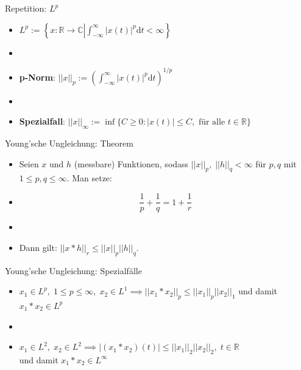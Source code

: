 \documentclass[14pt, aspectratio=169, handout]{beamer}
\begin{document}
\begin{frame}{Repetition: $L^p$}
    \begin{itemize}
        \item $L^p := \left\{ x:\mathbb{R} \to \mathbb{C} \left| \displaystyle\int_{-\infty}^{\infty} |x(t)|^p \text{d}t < \infty \right. \right\}$
        \item[] 
        \item \textbf{p-Norm}: $||x||_p := \left(\displaystyle\int_{-\infty}^{\infty} |x(t)|^p \text{d}t\right)^{1/p}$
        \item[] 
        \item \textbf{Spezialfall}: $||x||_{\infty} := \inf\{C \geq 0: |x(t)| \leq C, \text{ für alle } t\in \mathbb{R}\}$
    \end{itemize}
\end{frame}

\begin{frame}{Young'sche Ungleichung: Theorem}
    \begin{itemize} 
        \item Seien $x$ und $h$ (messbare) Funktionen, sodass $||x||_p, \; ||h||_q < \infty$ für $p,q$ mit $1 \leq p,q \leq \infty$. Man setze:
        \item[] 
        $$\frac{1}{p} + \frac{1}{q} = 1 + \frac{1}{r}$$
        \item[] 
        \item[] Dann gilt: $||x \ast h||_r \leq ||x||_p||h||_q$.
    \end{itemize}
\end{frame}

\begin{frame}{Young'sche Ungleichung: Spezialfälle}
    \begin{itemize}
        \item $x_1 \in L^p, \; 1 \leq p \leq \infty, \; x_2 \in L^1 \implies ||x_1 \ast x_2 ||_p \leq ||x_1||_p ||x_2||_1$ und damit $x_1 \ast x_2 \in L^p$
        \item[] 
        \item $x_1 \in L^2, \; x_2 \in L^2 \implies |(x_1 \ast x_2 )(t)| \leq ||x_1||_2 ||x_2||_2, \; t \in \mathbb{R}$ \\und damit $x_1 \ast x_2 \in L^\infty$
    \end{itemize}
\end{frame}
\end{document}
